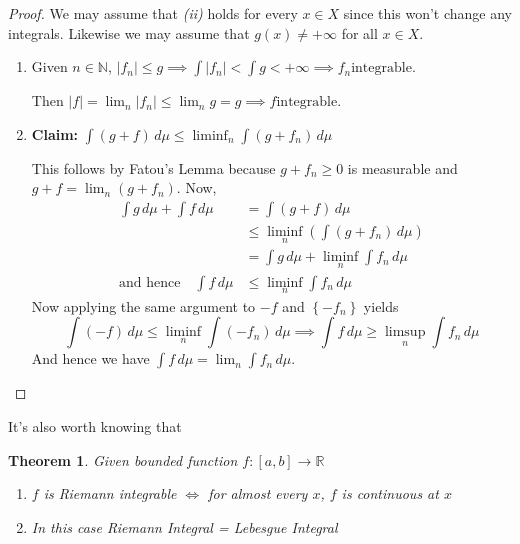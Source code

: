 \documentclass[11pt]{article}
\newcommand{\abs}[1]{|#1|}
\newcommand{\dm}{\ensuremath{\,d\mu}}
\newcommand{\R}{\mathbb{R}}
\newcommand{\N}{\mathbb{N}}
\newtheorem{theorem}{Theorem}[section]
\begin{document}
\begin{proof}
We may assume that \textit{(ii)} holds for every $x\in X$ since this won't change any integrals.
Likewise we may assume that $g(x)\neq + \infty$ for all $x\in X$.
\begin{enumerate}
	\item Given $n\in\N$, $\abs{f_n}\leq g\implies \int \abs{f_n} < \int g < + \infty \implies f_n \text{integrable}$.

		Then $\abs{f}=\lim_n\abs{f_n}\leq \lim_n g = g\implies f\text{integrable}$.
	\item \textbf{Claim: }$\int\left(g+f\right)\dm\leq\liminf_n\int\left(g+f_n\right)\dm$
		
		This follows by Fatou's Lemma because $g+f_n\geq 0$ is measurable and $g+f=\lim_n\left(g+f_n\right)$.
		Now,
		\begin{align*}
			\int g \dm + \int f \dm &= \int (g+f)\dm \\
									&\leq \liminf_n \left(\int \left(g+ f_n\right)\dm\right) \\
									&= \int g \dm + \liminf_n \int f_n \dm \\
			\text{and hence}\quad \int f \dm &\leq \liminf_n \int f_n \dm
		\end{align*}
		Now applying the same argument to $-f$ and $\left\{-f_n\right\}$ yields
		\[
			\int(-f)\dm \leq \liminf_n\int(-f_n)\dm \implies \int f \dm \geq \limsup_n \int f_n \dm
		\]
		And hence we have $\int f \dm = \lim_n \int f_n \dm$.
\end{enumerate}
\end{proof}
It's also worth knowing that
\begin{theorem}
Given bounded function $f:[a, b]\to\R$
\begin{enumerate}[label=(\alph*)]
	\item $f$ is Riemann integrable $\iff$ for almost every $x$, $f$ is continuous at $x$
	\item In this case Riemann Integral = Lebesgue Integral
\end{enumerate}
\end{theorem}
\end{document}
